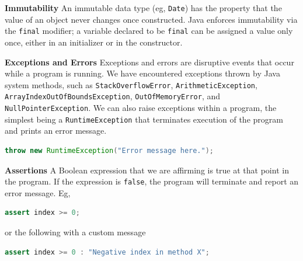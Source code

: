 \documentclass[8pt,a4paper,compress]{beamer}
\begin{document}
\begin{frame}[fragile]
\pause

\textbf{Immutability} An immutable data type (eg, \lstinline$Date$) has the property that the value of an object never changes once constructed. Java enforces immutability via the \lstinline$final$ modifier; a variable declared to be \lstinline$final$ can be assigned a value only once, either in an initializer or in the constructor.

\pause
\smallskip

\textbf{Exceptions and Errors} Exceptions and errors are disruptive events that occur while a program is running. We have encountered exceptions thrown by Java system methods, such as   \lstinline$StackOverflowError$, \lstinline$ArithmeticException$, \lstinline$ArrayIndexOutOfBoundsException$, \lstinline$OutOfMemoryError$, and \lstinline$NullPointerException$. We can also raise exceptions within a program, the simplest being a \lstinline$RuntimeException$ that terminates execution of the program and prints an error message.

\begin{lstlisting}[language=Java]
throw new RuntimeException("Error message here.");
\end{lstlisting}

\pause
\smallskip

\textbf{Assertions} A Boolean expression that we are affirming is true at that point in the program. If the expression is \lstinline$false$, the program will terminate and report an error message. Eg,

\begin{lstlisting}[language=Java]
assert index >= 0;
\end{lstlisting}

or the following with a custom message

\begin{lstlisting}[language=Java]
assert index >= 0 : "Negative index in method X";
\end{lstlisting}
\end{frame}
\end{document}
